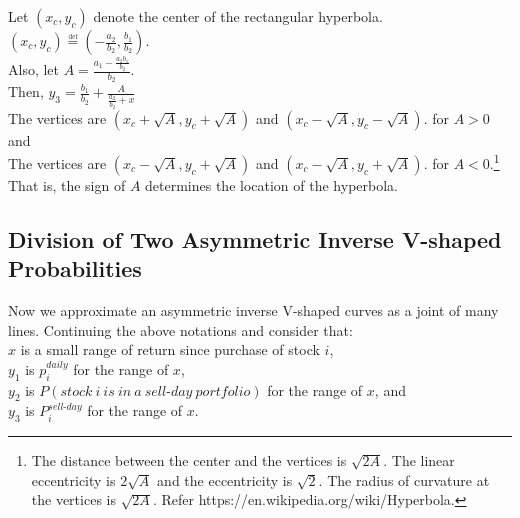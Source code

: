 \documentclass[11pt, a4paper]{article}
\begin{document}
\noindent
Let $(x_c, y_c)$ denote the center of the rectangular hyperbola. \\
$(x_c, y_c) \overset{\underset{\mathrm{def}}{}}{=} (-\frac{a_2}{b_2}, \frac{b_1}{b_2})$.\\

\noindent
Also, let $A = \frac{a_1-\frac{a_2 b_1}{b_2}}{b_2}$. \\
Then, $y_3= \frac{b_1}{b_2}+\frac{A}{\frac{a_2}{b_2}+x}$\\

\noindent
The vertices are $(x_c+\sqrt{A}, y_c+\sqrt{A})$ and $(x_c-\sqrt{A}, y_c-\sqrt{A})$. for $A>0$ and\\
The vertices are $(x_c-\sqrt{A}, y_c+\sqrt{A})$ and $(x_c-\sqrt{A}, y_c+\sqrt{A})$. for $A<0$.\footnote{The distance between the center and the vertices is $\sqrt{2A}$. The linear eccentricity is $2\sqrt{A}$ and the eccentricity is $\sqrt{2}$. The radius of curvature at the vertices is $\sqrt{2A}$. Refer https://en.wikipedia.org/wiki/Hyperbola.}\\
That is, the sign of $A$ determines the location of the hyperbola.


\subsection{Division of Two Asymmetric Inverse V-shaped Probabilities}
\label{section:division_two_inverse_v}

Now we approximate an asymmetric inverse V-shaped curves as a joint of many lines. Continuing the above notations and consider that:\\
$x$ is a small range of return since purchase of stock $i$,\\
$y_1$ is $p^{daily}_{i}$ for the range of $x$,\\
$y_2$ is $P(stock~i~is~in~a~sell\mbox{-}day~portfolio)$ for the range of $x$, and \\
$y_3$ is $P^{sell\mbox{-}day}_{i}$ for the range of $x$. \\
\noindent
\end{document}
